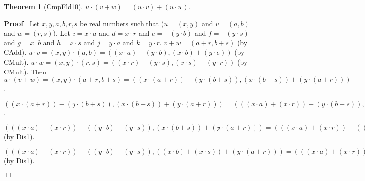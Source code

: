\documentclass{article}
\newenvironment{forthel}{\begin{leftbar}}{\end{leftbar}}
\newenvironment{proof}{\noindent\textbf{Proof\ }}{\hspace*{\fill}$\Box$\medskip}
\newtheorem{theorem}{Theorem}
\newcommand{\cmul}{\cdot}
\newcommand{\cadd}{+}
\begin{document}
\begin{forthel}
\begin{theorem}[CmpFld10] $u \cmul (v \cadd w) = (u \cmul v)  \cadd  (u \cmul w)$.
\end{theorem}\begin{proof}
	Let $x,y,a,b,r,s$ be real numbers such that ($u = (x,y)$ and $v = (a,b)$ and $w = (r,s)$).\newline
Let $c = x \cdot a$ and $d = x \cdot r$ and $e = -(y \cdot b)$ and $f = -(y \cdot s)$ and $g = x \cdot b$ and $ h = x \cdot s$ and  $j = y \cdot a$ and $k = y \cdot r$.\newline
$v \cadd w = (a+r,b+s)$ (by CAdd).\newline
$u \cmul v = (x,y)  \cmul  (a,b) = ((x \cdot a) - (y \cdot b), (x \cdot b) + (y \cdot a))$ (by CMult).  \newline
$u \cmul w = (x,y)  \cmul  (r,s) = ((x \cdot r) - (y \cdot s) , (x \cdot s) + (y \cdot r))$ (by CMult). \newline
Then $u \cmul (v \cadd w) 	= (x,y)  \cmul  (a+r,b+s) = ( (x \cdot (a+r)) - (y \cdot (b+s)) , (x \cdot (b+s)) + (y \cdot (a+r)) )$.\newline

$( (x \cdot (a+r)) - (y \cdot (b+s)) , (x \cdot (b+s)) + (y \cdot (a+r)) )
= ( ((x \cdot a) + (x \cdot r)) - (y \cdot (b+s)) , (x \cdot (b+s)) + (y \cdot (a+r)) )
= ( ((x \cdot a) + (x \cdot r)) - ((y \cdot b) + (y \cdot s)) , (x \cdot (b+s)) + (y \cdot (a+r)) )$.\newline

$( ((x \cdot a) + (x \cdot r)) - ((y \cdot b) + (y \cdot s)) , (x \cdot (b+s)) + (y \cdot (a+r)) )
= ( ((x \cdot a) + (x \cdot r)) - ((y \cdot b) + (y \cdot s)) , ((x \cdot b) + (x \cdot s)) + (y \cdot (a+r)) )$ (by Dis1).\newline

$( ((x \cdot a) + (x \cdot r)) - ((y \cdot b) + (y \cdot s)) , ((x \cdot b) + (x \cdot s)) + (y \cdot (a+r)) )
= ( ((x \cdot a) + (x \cdot r)) - ((y \cdot b) + (y \cdot s)) , ((x \cdot b) + (x \cdot s)) + ((y \cdot a) + (y \cdot r)) )$ (by Dis1).\newline


\end{proof}
\end{forthel}
\end{document}
